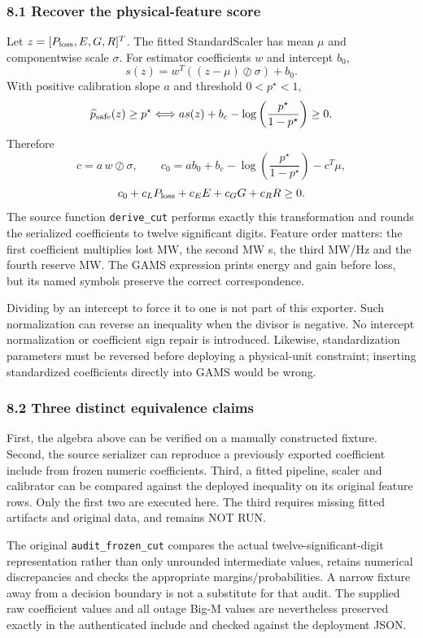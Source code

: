 \documentclass[
  11pt,
  a4paper,
]{article}
\begin{document}
\subsubsection{8.1 Recover the physical-feature
score}\label{recover-the-physical-feature-score}

Let \(z=[P_{\rm loss},E,G,R]^T\). The fitted StandardScaler has mean
\(\mu\) and componentwise scale \(\sigma\). For estimator coefficients
\(w\) and intercept \(b_0\), \[
s(z)=w^T\left((z-\mu)\oslash\sigma\right)+b_0.
\] With positive calibration slope \(a\) and threshold \(0<p^\star<1\),
\[
\widehat p_{\rm safe}(z)\ge p^\star
\Longleftrightarrow
as(z)+b_c-\log\left(\frac{p^\star}{1-p^\star}\right)\ge0.
\] Therefore \[
c=a\,w\oslash\sigma,\qquad
c_0=a b_0+b_c-\log\left(\frac{p^\star}{1-p^\star}\right)-c^T\mu,
\] \[
c_0+c_LP_{\rm loss}+c_EE+c_GG+c_RR\ge0.
\] The source function \texttt{derive\_cut} performs exactly this
transformation and rounds the serialized coefficients to twelve
significant digits. Feature order matters: the first coefficient
multiplies lost MW, the second MW s, the third MW/Hz and the fourth
reserve MW. The GAMS expression prints energy and gain before loss, but
its named symbols preserve the correct correspondence.

Dividing by an intercept to force it to one is not part of this
exporter. Such normalization can reverse an inequality when the divisor
is negative. No intercept normalization or coefficient sign repair is
introduced. Likewise, standardization parameters must be reversed before
deploying a physical-unit constraint; inserting standardized
coefficients directly into GAMS would be wrong.

\subsubsection{8.2 Three distinct equivalence
claims}\label{three-distinct-equivalence-claims}

First, the algebra above can be verified on a manually constructed
fixture. Second, the source serializer can reproduce a previously
exported coefficient include from frozen numeric coefficients. Third, a
fitted pipeline, scaler and calibrator can be compared against the
deployed inequality on its original feature rows. Only the first two are
executed here. The third requires missing fitted artifacts and original
data, and remains NOT RUN.

The original \texttt{audit\_frozen\_cut} compares the actual
twelve-significant-digit representation rather than only unrounded
intermediate values, retains numerical discrepancies and checks the
appropriate margins/probabilities. A narrow fixture away from a decision
boundary is not a substitute for that audit. The supplied raw
coefficient values and all outage Big-M values are nevertheless
preserved exactly in the authenticated include and checked against the
deployment JSON.
\end{document}
